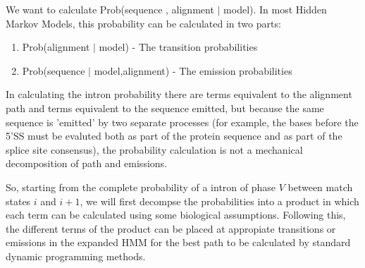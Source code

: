 We want to calculate Prob(sequence , alignment  $|$  model).
In most Hidden Markov Models, this probability can be calculated
in two parts:
\begin{enumerate}
\item Prob(alignment $|$ model) - The transition probabilities
\item Prob(sequence $|$ model,alignment) - The emission probabilities
\end{enumerate}
        
In calculating the intron probability there are terms equivalent to
the alignment path and terms equivalent to the sequence emitted, but
because the same sequence is 'emitted' by two separate processes (for
example, the bases before the 5'SS must be evaluted both as part of
the protein sequence and as part of the splice site consensus), the
probability calculation is not a mechanical decomposition of path and
emissions.

So, starting from the complete probability of a intron of phase $V$
between match states $i$ and $i+1$, we will first decompse the
probabilities into a product in which each term can be calculated
using some biological assumptions. Following this, the different terms
of the product can be placed at appropiate transitions or emissions in
the expanded HMM for the best path to be calculated by standard
dynamic programming methods.

